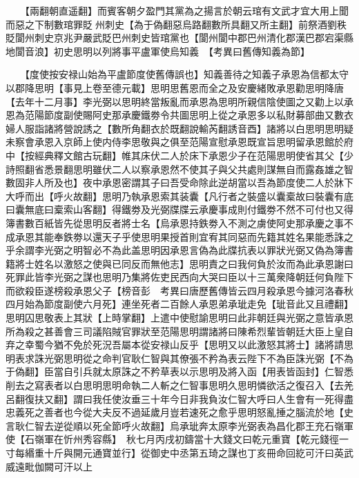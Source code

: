 　　【兩翻朝直遥翻】而賓客朝夕盈門其黨為之揚言於朝云琯有文武才宜大用上聞而惡之下制數琯罪貶州刺史【為于偽翻惡烏路翻數所具翻又所主翻】前祭酒劉秩貶閬州刺史京兆尹嚴武貶巴州刺史皆琯黨也【閬州閬中郡巴州清化郡漢巴郡宕渠縣地閬音浪】初史思明以列將事平盧軍使烏知義　【考異曰舊傳知義為節】

　　【度使按安禄山始為平盧節度使舊傳誤也】知義善待之知義子承恩為信都太守以郡降思明【事見上卷至德元載】思明思舊恩而全之及安慶緒敗承恩勸思明降唐【去年十二月事】李光弼以思明終當叛亂而承恩為思明所親信陰使圖之又勸上以承恩為范陽節度副使賜阿史那承慶鐵劵令共圖思明上從之承恩多以私財募部曲又數衣婦人服詣諸將營說誘之【數所角翻衣於既翻說輸芮翻誘音酉】諸將以白思明思明疑未察會承恩入京師上使内侍李思敬與之俱至范陽宣慰承恩既宣旨思明留承恩館於府中【按經典釋文館古玩翻】帷其床伏二人於床下承恩少子在范陽思明使省其父【少詩照翻省悉景翻思明雖伏二人以察承恩然不使其子與父共處則謀無自而露姦雄之智數固非人所及也】夜中承恩密謂其子曰吾受命除此逆胡當以吾為節度使二人於牀下大呼而出【呼火故翻】思明乃執承恩索其装囊【凡行者之裝盛以囊槖故曰裝囊有底曰囊無底曰槖索山客翻】得鐵劵及光弼牒牒云承慶事成則付鐵劵不然不可付也又得簿書數百紙皆先從思明反者將士名【烏承恩持鉄劵入不測之虜使阿史那承慶之事不成承恩其能奉鉄劵以還天子乎使思明果授首則宜宥其同惡而先籍其姓名果能悉誅之乎余謂李光弼之明智必不為此盖思明因承恩言偽為此牒抗表以罪狀光弼又偽為簿書籍將士姓名以激怒之使與已同反而無他志】思明責之曰我何負於汝而為此承恩謝曰死罪此皆李光弼之謀也思明乃集將佐吏民西向大哭曰臣以十三萬衆降朝廷何負陛下而欲殺臣遂榜殺承恩父子【榜音彭　考異曰唐歷舊傳皆云四月殺承恩今據河洛春秋四月始為節度副使六月死】連坐死者二百餘人承恩弟承玼走免【玼音此又且禮翻】思明囚思敬表上其狀【上時掌翻】上遣中使慰諭思明曰此非朝廷與光弼之意皆承恩所為殺之甚善會三司議陷賊官罪狀至范陽思明謂諸將曰陳希烈輩皆朝廷大臣上皇自弃之幸蜀今猶不免於死況吾屬本從安禄山反乎【思明又以此激怒其將士】諸將請思明表求誅光弼思明從之命判官耿仁智與其僚張不矜為表云陛下不為臣誅光弼【不為于偽翻】臣當自引兵就太原誅之不矜草表以示思明及將入函【用表皆函封】仁智悉削去之寫表者以白思明思明命執二人斬之仁智事思明久思明憐欲活之復召入【去羌呂翻復扶又翻】謂曰我任使汝垂三十年今日非我負汝仁智大呼曰人生會有一死得盡忠義死之善者也今從大夫反不過延歲月豈若速死之愈乎思明怒亂捶之腦流於地【史言耿仁智去逆從順以死全節呼火故翻】烏承玼奔太原李光弼表為昌化郡王充石嶺軍使【石嶺軍在忻州秀容縣】　秋七月丙戌初鑄當十大錢文曰乾元重寶【乾元錢徑一寸每緡重十斤與開元通寶並行】從御史中丞第五琦之謀也丁亥冊命回紇可汗曰英武威遠毗伽闕可汗以上

